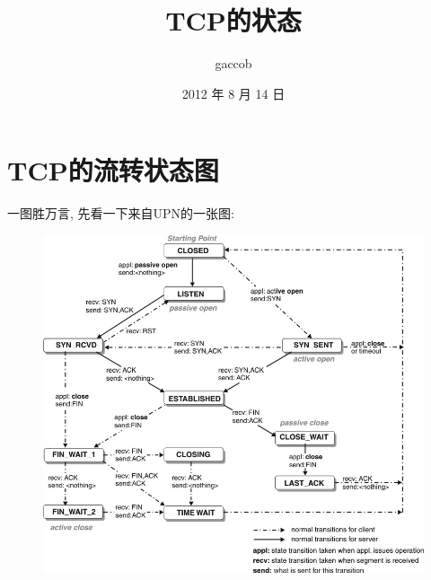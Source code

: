 

\title {\ZHH \huge TCP的状态}
\author {\small gaccob}
\date {\small 2012 年 8 月 14 日}
\maketitle

\section {\ZHH TCP的流转状态图} {
    {一图胜万言, 先看一下来自UPN的一张图: }\par
    \begin{figure}[htbp]
        \centering
        \includegraphics [width=400pt, keepaspectratio] {tcp_status.jpg}
    \end{figure}

}
